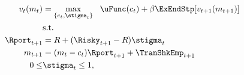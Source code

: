   \begin{equation*}\begin{gathered}\begin{aligned}
        \vFunc_{t}(m_{t})  & = \max_{\{{c}_{t},\stigma_{t}\}}   ~~ \uFunc(c_{t}) +  \DiscFac
        \ExEndStp[{\vFunc}_{t+1}(m_{t+1})]
        \\      & \text{s.t.} \nonumber
        \\      \Rport_{t+1}  & = \Rfree + (\Risky_{t+1}-\Rfree) \stigma_{t}
        \\      m_{t+1}  & = (m_{t}-c_{t})\Rport_{t+1} + \TranShkEmp_{t+1}
        \\  0       \leq & \stigma_{t}  \leq 1, \label{eq:noshorts}
      \end{aligned}\end{gathered}\end{equation*}
